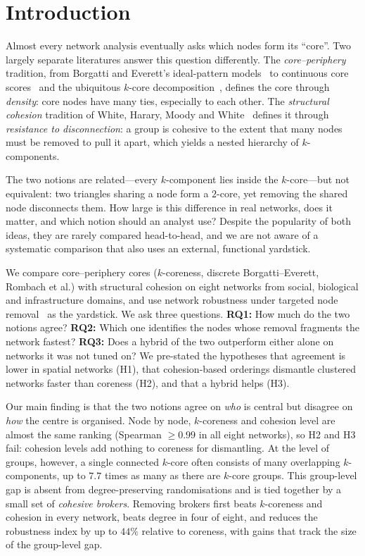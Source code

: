 \documentclass[conference]{IEEEtran}
\begin{document}
\section{Introduction}
\label{sec:intro}
Almost every network analysis eventually asks which nodes form its ``core''. Two largely separate
literatures answer this question differently. The \emph{core--periphery} tradition, from Borgatti and
Everett's ideal-pattern models~\cite{borgatti2000models} to continuous core scores~\cite{rombach2014core}
and the ubiquitous $k$-core decomposition~\cite{seidman1983network,batagelj2003cores}, defines the core
through \emph{density}: core nodes have many ties, especially to each other. The
\emph{structural cohesion} tradition of White, Harary, Moody and
White~\cite{white2001cohesiveness,moody2003structural} defines it through \emph{resistance to
disconnection}: a group is cohesive to the extent that many nodes must be removed to pull it apart, which
yields a nested hierarchy of $k$-components.

The two notions are related---every $k$-component lies inside the $k$-core---but not equivalent: two
triangles sharing a node form a $2$-core, yet removing the shared node disconnects them. How large is
this difference in real networks, does it matter, and which notion should an analyst use? Despite the
popularity of both ideas, they are rarely compared head-to-head, and we are not aware of a systematic
comparison that also uses an external, functional yardstick.

We compare core--periphery cores ($k$-coreness, discrete Borgatti--Everett, Rombach et al.) with
structural cohesion on eight networks from social, biological and infrastructure domains, and use
network robustness under targeted node removal~\cite{albert2000error,schneider2011mitigation} as the
yardstick. We ask three questions. \textbf{RQ1:} How much do the two notions agree? \textbf{RQ2:} Which one
identifies the nodes whose removal fragments the network fastest? \textbf{RQ3:} Does a hybrid of the two
outperform either alone on networks it was not tuned on? We pre-stated the hypotheses that agreement is
lower in spatial networks (H1), that cohesion-based orderings dismantle clustered networks faster than
coreness (H2), and that a hybrid helps (H3).

Our main finding is that the two notions agree on \emph{who} is central but disagree on \emph{how} the
centre is organised. Node by node, $k$-coreness and cohesion level are almost the same ranking
(Spearman $\ge0.99$ in all eight networks), so H2 and H3 fail: cohesion levels add nothing to coreness
for dismantling. At the level of groups, however, a single connected $k$-core often consists of many
overlapping $k$-components, up to $7.7$ times as many as there are $k$-core groups. This group-level gap is
absent from degree-preserving randomisations and is tied together by a small set of \emph{cohesive
brokers}. Removing brokers first beats $k$-coreness and cohesion in every network, beats degree in four
of eight, and reduces the robustness index by up to $44\%$ relative to coreness, with gains that track the
size of the group-level gap.
\end{document}
